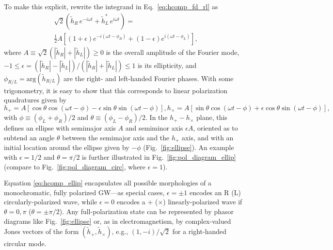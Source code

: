 \documentclass[aps,prd,twocolumn,superscriptaddress,preprintnumbers,floatfix,nofootinbib]{revtex4-2}
\newcommand{\beq}{\begin{equation}}
\newcommand{\eeq}{\end{equation}}
\begin{document}
To make this explicit, rewrite the integrand in Eq.~\eqref{eq:hcomp_fd_rl} as
\begin{align}
\sqrt{2} \left(\tilde{h}_R\, e^{-i \omega t} + \tilde{h}_L^*\, e^{i \omega t}\right) =\nonumber\\
\frac{1}{2}A\left[ \left(1+\epsilon\right) e^{-i (\omega t - \phi_R)} + \left(1-\epsilon\right) e^{i (\omega t - \phi_L)} \right],
\end{align}
where
$A \equiv \sqrt{2} \left(|\tilde{h}_R| + |\tilde{h}_L| \right) \geq 0$ is the overall amplitude of the Fourier mode, $-1 \leq \epsilon = (|\tilde{h}_R| - |\tilde{h}_L|)/(|\tilde{h}_R| + |\tilde{h}_L|) \leq 1$ is its ellipticity, and $\phi_{R/L} = \mathrm{arg}(\tilde{h}_{R/L})$ are the right- and left-handed Fourier phases.
With some trigonometry, it is easy to show that this corresponds to linear polarization quadratures given by
\begin{subequations} \label{eq:hcomp_ellip}
\beq
h_+ = A \left[\cos \theta \cos(\omega t - \phi) - \epsilon \sin \theta \sin(\omega t - \phi)\right] ,
\eeq
\beq
h_\times = A \left[\sin \theta \cos(\omega t - \phi) + \epsilon \cos \theta \sin(\omega t - \phi)\right] ,
\eeq
\end{subequations}
with $\phi \equiv (\phi_L + \phi_R)/2$ and $\theta \equiv (\phi_L - \phi_R)/2$. 
In the $h_+{-}h_\times$ plane, this defines an ellipse with semimajor axis $A$ and semiminor axis $\epsilon A$, oriented as to subtend an angle $\theta$ between the semimajor axis and the $h_+$ axis, and with an initial location around the ellipse given by $-\phi$ (Fig.~\ref{fig:ellipse}).
An example with $\epsilon=1/2$ and $\theta = \pi/2$ is further illustrated in Fig.~\ref{fig:pol_diagram_ellip} (compare to Fig.~\ref{fig:pol_diagram_circ}, where $\epsilon=1$).

Equation \eqref{eq:hcomp_ellip} encapsulates all possible morphologies of a monochromatic, fully polarized GW---as special cases, $\epsilon = \pm 1$ encodes an R (L) circularly-polarized wave, while $\epsilon =0$ encodes a $+$ ($\times$) linearly-polarized wave if $\theta = 0,\pi$ ($\theta = \pm \pi/2$).
Any full-polarization state can be represented by phasor diagrams like Fig.~\ref{fig:ellipse} or, as in electromagnetism, by complex-valued Jones vectors of the form $\left(\tilde{h}_+, \tilde{h}_{\times}\right)$, e.g., $\left(1, -i\right)/\sqrt{2}$ for a right-handed circular mode.
\end{document}
